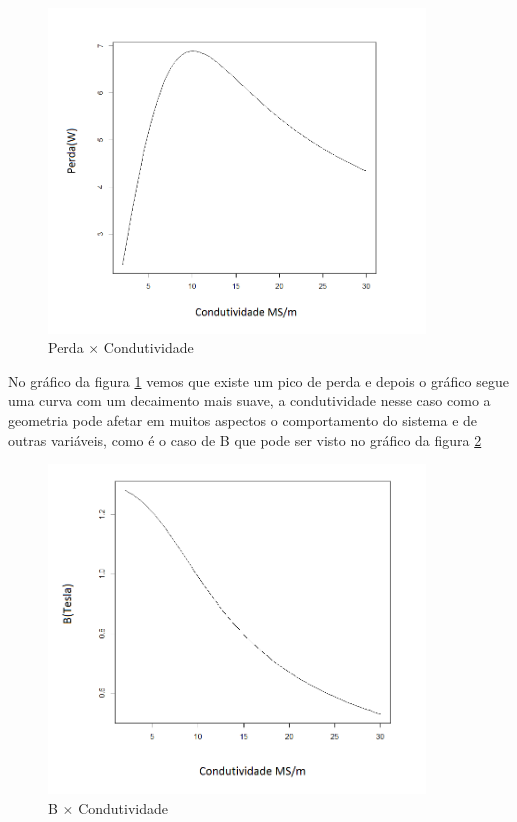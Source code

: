 \documentclass[
	12pt,				%
	openright,			%
	twoside,			%
	a4paper,			%
	english,			%
	french,				%
	spanish,			%
	brazil,				%
	]{abntex2}
\begin{document}
\begin{figure}[H]
    \centering
    \includegraphics[width=10cm]{img/perda_condutividade.png}
    \caption{Perda $\times$ Condutividade}
    \label{fig:gra_p_c}
\end{figure}

No gráfico da figura \ref{fig:gra_p_c} vemos que existe um pico de perda e depois o gráfico segue uma curva com um decaimento mais suave, a condutividade nesse caso como a geometria pode afetar em muitos aspectos o comportamento do sistema e de outras variáveis, como é o caso de B que pode ser visto no gráfico da figura \ref{fig:gra_b_c} 

\begin{figure}[H]
    \centering
    \includegraphics[width=10cm]{img/b_condutividade.png}
    \caption{B $\times$ Condutividade}
    \label{fig:gra_b_c}
\end{figure}
\end{document}
